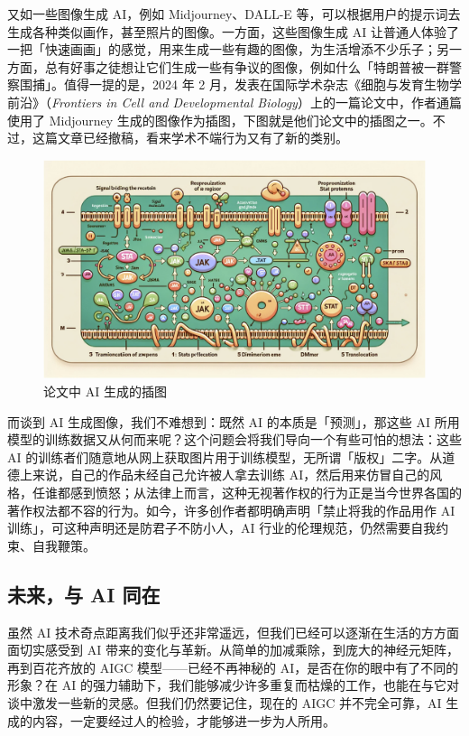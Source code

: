 又如一些图像生成 AI，例如 Midjourney、DALL-E 等，可以根据用户的提示词去生成各种类似画作，甚至照片的图像。一方面，这些图像生成 AI 让普通人体验了一把「快速画画」的感觉，用来生成一些有趣的图像，为生活增添不少乐子；另一方面，总有好事之徒想让它们生成一些有争议的图像，例如什么「特朗普被一群警察围捕」。值得一提的是，2024 年 2 月，发表在国际学术杂志《细胞与发育生物学前沿》（\textit{Frontiers in Cell and Developmental Biology}）上的一篇论文中，作者通篇使用了 Midjourney 生成的图像作为插图，下图就是他们论文中的插图之一。不过，这篇文章已经撤稿，看来学术不端行为又有了新的类别。

\begin{figure}[htb!]
  \centering
  \includegraphics[width=.75\textwidth]{assets/surpass/FigureByMidjourney.jpg}
  \caption{论文中 AI 生成的插图}
  \label{fig:FigureByMidjourney}
\end{figure}

而谈到 AI 生成图像，我们不难想到：既然 AI 的本质是「预测」，那这些 AI 所用模型的训练数据又从何而来呢？这个问题会将我们导向一个有些可怕的想法：这些 AI 的训练者们随意地从网上获取图片用于训练模型，无所谓「版权」二字。从道德上来说，自己的作品未经自己允许被人拿去训练 AI，然后用来仿冒自己的风格，任谁都感到愤怒；从法律上而言，这种无视著作权的行为正是当今世界各国的著作权法都不容的行为。如今，许多创作者都明确声明「禁止将我的作品用作 AI 训练」，可这种声明还是防君子不防小人，AI 行业的伦理规范，仍然需要自我约束、自我鞭策。

\subsection{未来，与 AI 同在}

虽然 AI 技术奇点距离我们似乎还非常遥远，但我们已经可以逐渐在生活的方方面面切实感受到 AI 带来的变化与革新。从简单的加减乘除，到庞大的神经元矩阵，再到百花齐放的 AIGC 模型——已经不再神秘的 AI，是否在你的眼中有了不同的形象？在 AI 的强力辅助下，我们能够减少许多重复而枯燥的工作，也能在与它对谈中激发一些新的灵感。但我们仍然要记住，现在的 AIGC 并不完全可靠，AI 生成的内容，一定要经过人的检验，才能够进一步为人所用。

